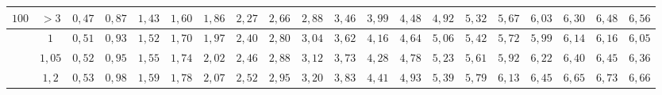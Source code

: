 \begin{table}[]
{\begin{tabular}{|c|c|c|c|c|c|c|c|c|c|c|c|c|c|c|c|c|c|c|c|}
\multirow{-5}{*}{$100$} & $>3$                                                                                & \cellcolor[HTML]{FFCCC9}$0,47$ & \cellcolor[HTML]{FFCCC9}$0,87$ & \cellcolor[HTML]{FFCCC9}$1,43$ & \cellcolor[HTML]{FFCCC9}$1,60$ & \cellcolor[HTML]{FFCCC9}$1,86$ & \cellcolor[HTML]{FD6864}$2,27$ & \cellcolor[HTML]{FD6864}$2,66$ & \cellcolor[HTML]{FD6864}$2,88$ & \cellcolor[HTML]{FE0000}$3,46$ & \cellcolor[HTML]{FE0000}$3,99$ & \cellcolor[HTML]{FE0000}$4,48$ & \cellcolor[HTML]{CB0000}$4,92$ & \cellcolor[HTML]{CB0000}$5,32$                        & \cellcolor[HTML]{9A0000}$5,67$ & \cellcolor[HTML]{9A0000}$6,03$ & \cellcolor[HTML]{F8A102}$6,30$ & \cellcolor[HTML]{F8A102}$6,48$ & \cellcolor[HTML]{F56B00}$6,56$ \\ \hline
                        & $1$                                                                                 & \cellcolor[HTML]{FFCCC9}$0,51$ & \cellcolor[HTML]{FFCCC9}$0,93$ & \cellcolor[HTML]{FFCCC9}$1,52$ & \cellcolor[HTML]{FFCCC9}$1,70$ & \cellcolor[HTML]{FD6864}$1,97$ & \cellcolor[HTML]{FD6864}$2,40$ & \cellcolor[HTML]{FD6864}$2,80$ & \cellcolor[HTML]{FD6864}$3,04$ & \cellcolor[HTML]{FE0000}$3,62$ & \cellcolor[HTML]{FE0000}$4,16$ & \cellcolor[HTML]{CB0000}$4,64$ & \cellcolor[HTML]{CB0000}$5,06$ & \cellcolor[HTML]{9A0000}$5,42$                        & \cellcolor[HTML]{9A0000}$5,72$ & \cellcolor[HTML]{F8A102}$5,99$ & \cellcolor[HTML]{F8A102}$6,14$ & \cellcolor[HTML]{F56B00}$6,16$ & \cellcolor[HTML]{CE6301}$6,05$ \\ \cline{2-20} 
                        & $1,05$                                                                              & \cellcolor[HTML]{FFCCC9}$0,52$ & \cellcolor[HTML]{FFCCC9}$0,95$ & \cellcolor[HTML]{FFCCC9}$1,55$ & \cellcolor[HTML]{FFCCC9}$1,74$ & \cellcolor[HTML]{FD6864}$2,02$ & \cellcolor[HTML]{FD6864}$2,46$ & \cellcolor[HTML]{FD6864}$2,88$ & \cellcolor[HTML]{FD6864}$3,12$ & \cellcolor[HTML]{FE0000}$3,73$ & \cellcolor[HTML]{FE0000}$4,28$ & \cellcolor[HTML]{CB0000}$4,78$ & \cellcolor[HTML]{CB0000}$5,23$ & \cellcolor[HTML]{9A0000}$5,61$                        & \cellcolor[HTML]{9A0000}$5,92$ & \cellcolor[HTML]{F8A102}$6,22$ & \cellcolor[HTML]{F8A102}$6,40$ & \cellcolor[HTML]{F56B00}$6,45$ & \cellcolor[HTML]{CE6301}$6,36$ \\ \cline{2-20} 
                        & $1,2$                                                                               & \cellcolor[HTML]{FFCCC9}$0,53$ & \cellcolor[HTML]{FFCCC9}$0,98$ & \cellcolor[HTML]{FFCCC9}$1,59$ & \cellcolor[HTML]{FFCCC9}$1,78$ & \cellcolor[HTML]{FD6864}$2,07$ & \cellcolor[HTML]{FD6864}$2,52$ & \cellcolor[HTML]{FD6864}$2,95$ & \cellcolor[HTML]{FD6864}$3,20$ & \cellcolor[HTML]{FE0000}$3,83$ & \cellcolor[HTML]{FE0000}$4,41$ & \cellcolor[HTML]{CB0000}$4,93$ & \cellcolor[HTML]{CB0000}$5,39$ & \cellcolor[HTML]{9A0000}$5,79$                        & \cellcolor[HTML]{9A0000}$6,13$ & \cellcolor[HTML]{F8A102}$6,45$ & \cellcolor[HTML]{F8A102}$6,65$ & \cellcolor[HTML]{F56B00}$6,73$ & \cellcolor[HTML]{CE6301}$6,66$ \\ \cline{2-20} 

\end{tabular}}
\end{table}
